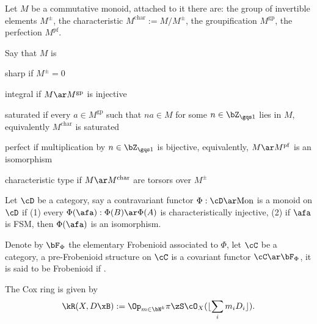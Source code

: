 \documentclass[0-main]{subfiles}
\begin{document}
\begin{dfn}
	Let $M$ be a commutative monoid, attached to it there are: the group of invertible elements $M^{\pm}$, the characteristic $M^{\mathrm{char}}:=M/M^{\pm}$, the groupification $M^{\mathrm{gp}}$, the perfection $M^{\mathrm{pf}}$.

	Say that $M$ is
	\begin{itm}
		\item sharp if $M^{\pm}=0$
		\item integral if $M\ar M^{\mathrm{gp}}$ is injective
		\item saturated if every $a\in M^{\mathrm{gp}}$ such that $na\in M$ for some $n\in\bZ_{\gqs1}$ lies in $M$, equivalently $M^{\mathrm{char}}$ is saturated
		\item perfect if multiplication by $n\in\bZ_{\gqs1}$ is bijective, equivalently, $M\ar M^{\mathrm{pf}}$ is an isomorphism
		\item characteristic type if $M\ar M^{\mathrm{char}}$ are torsors over $M^{\pm}$
\end{itm}


\end{dfn}

\begin{dfn}
	Let $\cD$ be a category, say a contravariant functor $\Phi:\cD\ar \mathrm{Mon}$ is a monoid on $\cD$ if (1) every $\Phi(\afa):\Phi(B)\ar\Phi(A)$ is characteristically injective, (2) if $\afa$ is FSM, then $\Phi(\afa)$ is an isomorphism.

	Denote by $\bF_{\Phi}$ the elementary Frobenioid associated to $\Phi$, let $\cC$ be a category, a pre-Frobenioid structure on $\cC$ is a covariant functor $\cC\ar\bF_{\Phi}$, it is said to be Frobenioid if \cite[Definition~1.3]{Mochizuki2008Frob1}.
\end{dfn}



The Cox ring is given by
\[
	\kR(X,D\xB):= \Op_{m\in\bN^{k}}\pi\zS\cO_{X}(\lfloor\sum_{i}m_{i}D_{i}\rfloor).
\]


\ifSubfilesClassLoaded{
	
	
}{}
\end{document}
